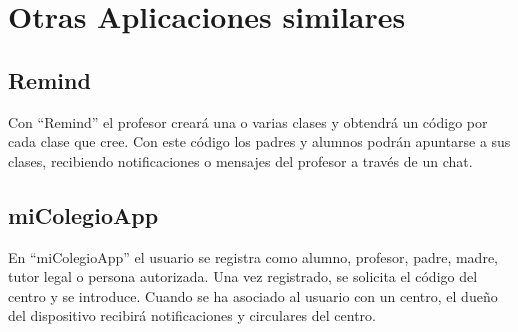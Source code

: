 \newpage
\section{Otras Aplicaciones similares}
	\subsection{Remind}
		Con “Remind” el profesor creará una o varias clases y obtendrá un código por cada clase que cree. Con este código los padres y alumnos podrán apuntarse a sus clases, recibiendo notificaciones o mensajes del profesor a través de un chat.
	
	\subsection{miColegioApp}
		En “miColegioApp” el usuario se registra como alumno, profesor, padre, madre, tutor legal o persona autorizada. Una vez registrado, se solicita el código del centro y se introduce. Cuando se ha asociado al usuario con un centro, el dueño del dispositivo recibirá notificaciones y circulares del centro.
		
